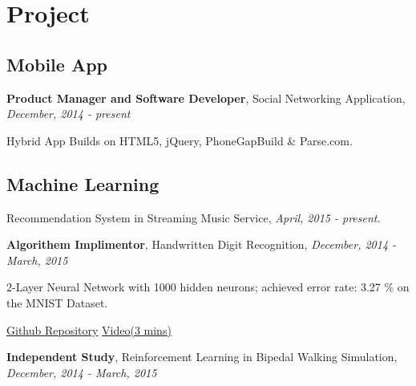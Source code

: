 \documentclass[letterpaper]{article}
\renewenvironment{itemize}{
  \begin{list}{}{
    \setlength{\leftmargin}{1.5em}
  }
}{
  \end{list}
}
\begin{document}
\section*{Project}

\subsection*{Mobile App}
\begin{itemize}
	\item[$\circ$] \textbf{Product Manager and Software Developer}, Social Networking Application, {\it December, 2014 - present}
	\begin{itemize}
		\item Hybrid App Builds on HTML5, jQuery, PhoneGap\texttrademark Build \& Parse.com.
	\end{itemize}
	
\end{itemize}

\subsection*{Machine Learning}
\begin{itemize}
	\item[$\circ$] Recommendation System in Streaming Music Service, {\it April, 2015 - present}.
	\item[$\circ$] \textbf{Algorithem Implimentor}, Handwritten Digit Recognition, {\it December, 2014 - March, 2015}
	\begin{itemize}
		\item 2-Layer Neural Network with 1000 hidden neurons; achieved error rate: 3.27 \% on the MNIST Dataset.
		\item \href{https://github.com/Yaliang/Handwritten}{\color[rgb]{0.2, 0.7, 0.7} Github Repository} \hspace{0.2in} \href{https://drive.google.com/file/d/0B0flKXz1pWAcb2RIVU5SbUd0dkU/view}{\color[rgb]{0.2, 0.7, 0.7} Video(3 mins)}
	\end{itemize}
	
	\item[$\circ$] \textbf{Independent Study}, Reinforcement Learning in Bipedal Walking Simulation, {\it December, 2014 - March, 2015}
\end{itemize}
\end{document}
